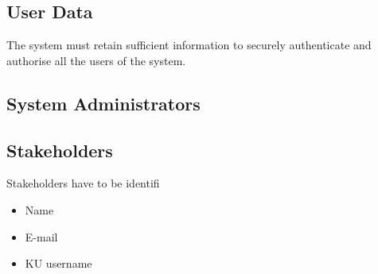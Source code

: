 
\subsection{User Data}

The system must retain sufficient information to securely authenticate and
authorise all the users of the system.

\subsection{System Administrators}

\subsection{Stakeholders}

Stakeholders have to be identifi

\begin{itemize}

\item Name

\item E-mail

\item KU username

\end{itemize}
